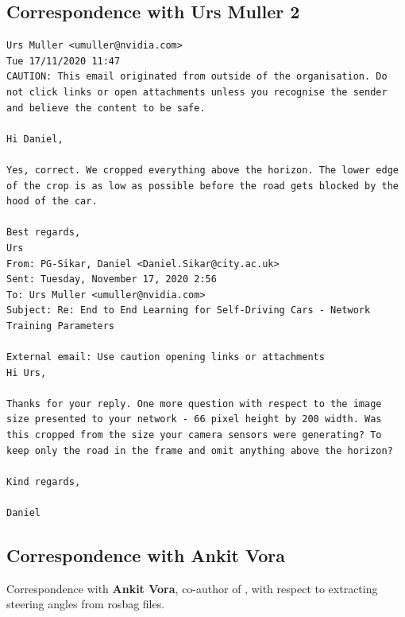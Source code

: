 \subsection{Correspondence with Urs Muller 2}
\label{urs_muller2}
\begin{verbatim}
Urs Muller <umuller@nvidia.com>
Tue 17/11/2020 11:47
CAUTION: This email originated from outside of the organisation. Do not click links or open attachments unless you recognise the sender and believe the content to be safe.

Hi Daniel,

Yes, correct. We cropped everything above the horizon. The lower edge of the crop is as low as possible before the road gets blocked by the hood of the car.

Best regards,
Urs
From: PG-Sikar, Daniel <Daniel.Sikar@city.ac.uk>
Sent: Tuesday, November 17, 2020 2:56
To: Urs Muller <umuller@nvidia.com>
Subject: Re: End to End Learning for Self-Driving Cars - Network Training Parameters
 
External email: Use caution opening links or attachments
Hi Urs,

Thanks for your reply. One more question with respect to the image size presented to your network - 66 pixel height by 200 width. Was this cropped from the size your camera sensors were generating? To keep only the road in the frame and omit anything above the horizon?

Kind regards,

Daniel    
\end{verbatim}

\subsection{Correspondence with Ankit Vora}
\label{ankit_vora}
Correspondence with \textbf{Ankit Vora}, co-author of \cite{agarwal2020ford}, with respect to extracting steering angles from rosbag files.

